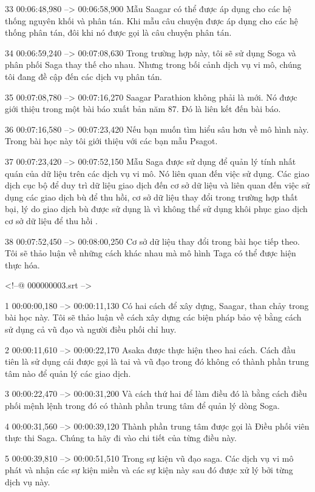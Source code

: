33
00:06:48,980 --> 00:06:58,900
Mẫu Saagar có thể được áp dụng cho các hệ thống nguyên khối và phân tán.  Khi mẫu câu chuyện được áp dụng cho các hệ thống phân tán, đôi khi nó được gọi là câu chuyện phân tán.

34
00:06:59,240 --> 00:07:08,630
Trong trường hợp này, tôi sẽ sử dụng Soga và phân phối Saga thay thế cho nhau.  Nhưng trong bối cảnh dịch vụ vi mô, chúng tôi đang đề cập đến các dịch vụ phân tán.

35
00:07:08,780 --> 00:07:16,270
Saagar Parathion không phải là mới.  Nó được giới thiệu trong một bài báo xuất bản năm 87.  Đó là liên kết đến bài báo.

36
00:07:16,580 --> 00:07:23,420
Nếu bạn muốn tìm hiểu sâu hơn về mô hình này.  Trong bài học này tôi giới thiệu với các bạn mẫu Psagot.

37
00:07:23,420 --> 00:07:52,150
Mẫu Saga được sử dụng để quản lý tính nhất quán của dữ liệu trên các dịch vụ vi mô.  Nó liên quan đến việc sử dụng.  Các giao dịch cục bộ để duy trì dữ liệu giao dịch đến cơ sở dữ liệu và liên quan đến việc sử dụng các giao dịch bù để thu hồi, cơ sở dữ liệu thay đổi trong trường hợp thất bại, lý do giao dịch bù được sử dụng là vì không thể sử dụng khôi phục giao dịch cơ sở dữ liệu để thu hồi  .

38
00:07:52,450 --> 00:08:00,250
Cơ sở dữ liệu thay đổi trong bài học tiếp theo.  Tôi sẽ thảo luận về những cách khác nhau mà mô hình Taga có thể được hiện thực hóa.

<!--@ 000000003.srt -->

1
00:00:00,180 --> 00:00:11,130
Có hai cách để xây dựng, Saagar, than chảy trong bài học này.  Tôi sẽ thảo luận về cách xây dựng các biện pháp bảo vệ bằng cách sử dụng cả vũ đạo và người điều phối chỉ huy.

2
00:00:11,610 --> 00:00:22,170
Asaka được thực hiện theo hai cách.  Cách đầu tiên là sử dụng cái được gọi là tai và vũ đạo trong đó không có thành phần trung tâm nào để quản lý các giao dịch.

3
00:00:22,470 --> 00:00:31,200
Và cách thứ hai để làm điều đó là bằng cách điều phối mệnh lệnh trong đó có thành phần trung tâm để quản lý dòng Soga.

4
00:00:31,560 --> 00:00:39,120
Thành phần trung tâm được gọi là Điều phối viên thực thi Saga.  Chúng ta hãy đi vào chi tiết của từng điều này.

5
00:00:39,810 --> 00:00:51,510
Trong sự kiện vũ đạo saga.  Các dịch vụ vi mô phát và nhận các sự kiện miền và các sự kiện này sau đó được xử lý bởi từng dịch vụ này.

